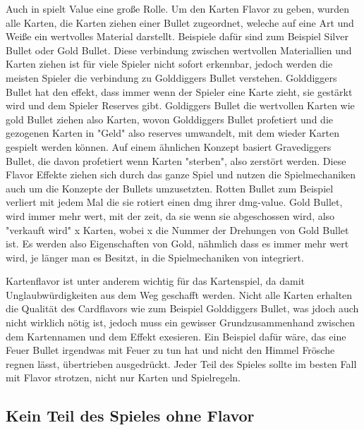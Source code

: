Auch in \FF spielt Value eine große Rolle.
Um den Karten Flavor zu geben, wurden alle Karten, die Karten ziehen einer Bullet zugeordnet, weleche auf eine Art und Weiße ein wertvolles Material darstellt.
Beispiele dafür sind zum Beispiel Silver Bullet oder Gold Bullet. Diese verbindung zwischen wertvollen
Materiallien und Karten ziehen ist für viele Spieler nicht sofort erkennbar, jedoch werden die meisten Spieler die verbindung zu Golddiggers Bullet verstehen.
Golddiggers Bullet hat den effekt, dass immer wenn der Spieler eine Karte zieht, sie gestärkt wird und dem Spieler Reserves gibt.
Goldiggers Bullet die wertvollen Karten wie gold Bullet ziehen also Karten, wovon Golddiggers Bullet profetiert und die
gezogenen Karten in "Geld" also reserves umwandelt, mit dem wieder Karten gespielt werden können. Auf einem ähnlichen Konzept basiert Gravediggers Bullet, die davon profetiert wenn Karten "sterben", also zerstört werden.
Diese Flavor Effekte ziehen sich durch das ganze Spiel und nutzen die Spielmechaniken auch um die Konzepte der Bullets umzusetzten.
Rotten Bullet zum Beispiel verliert mit jedem Mal die sie rotiert einen dmg ihrer dmg-value. Gold Bullet, wird immer mehr
wert, mit der zeit, da sie wenn sie abgeschossen wird, also "verkauft wird" x Karten, wobei x die Nummer der Drehungen
von Gold Bullet ist. Es werden also Eigenschaften von Gold, nähmlich dass es immer mehr wert wird, je länger man es Besitzt,
in die Spielmechaniken von \FF integriert.


Kartenflavor ist unter anderem wichtig für das Kartenspiel, da damit Unglaubwürdigkeiten aus dem Weg geschafft werden.
Nicht alle Karten erhalten die Qualität des Cardflavors wie zum Beispiel Golddiggers Bullet, was jdoch auch nicht wirklich nötig ist, jedoch muss ein gewisser Grundzusammenhand zwischen dem Kartennamen und dem Effekt exesieren.
Ein Beispiel dafür wäre, das eine Feuer Bullet irgendwas mit Feuer zu tun hat und nicht den Himmel Frösche regnen lässt,
übertrieben ausgedrückt. Jeder Teil des Spieles sollte im besten Fall mit Flavor strotzen, nicht nur Karten und Spielregeln.



\subsection{Kein Teil des Spieles ohne Flavor}\label{subsec:keinTeildesSpielesOhneFlavor}

